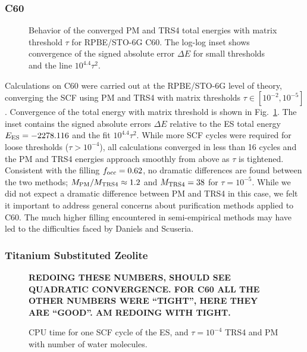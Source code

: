 \commentoutA{\documentclass[prb,aps,twocolumn,twocolumngrid,secnumarabic]{revtex4}}
\begin{document}
\subsubsection{C60}
\begin{figure}[t]
\caption{Behavior of the converged PM and TRS4 total energies with matrix threshold $\tau$
         for RPBE/STO-6G C60.  The log-log inset shows 
         convergence of the signed absolute error $\Delta E$ for small 
         thresholds and the line $10^{4.4} \tau^2$.}\label{c60convergence}
\end{figure}

Calculations on C60 were carried out at the RPBE/STO-6G level of theory, converging the
SCF using PM and TRS4 with matrix thresholds $\tau \in [10^{-2},10^{-5}]$.  
Convergence of the total energy with matrix threshold is shown in Fig.~\ref{c60convergence}.  The inset contains 
the signed absolute errors $\Delta E$ relative to the ES total energy $E_{\rm ES}=-2278.116$ 
and the fit $10^{4.4} \tau^2$.  While more SCF cycles were required for loose thresholds ($\tau > 10^{-4}$), 
all calculations converged in less than 16 cycles and the PM and TRS4 energies approach 
smoothly from above as $\tau$ is tightened.  Consistent with the filling $f_{\rm occ}=0.62$, no dramatic
differences are found between the two methods; $M_{\rm PM}/M_{\rm TRS4} \approx 1.2$ and 
$M_{\rm TRS4}=38$ for $\tau=10^{-5}$.   While we did not expect a dramatic difference between 
PM and TRS4 in this case, we felt it important to address general concerns about purification methods applied 
to C60.    The much higher filling encountered in semi-empirical methods may have led to the difficulties 
faced by Daniels and Scuseria\cite{ADaniels99}.

\subsubsection{Titanium Substituted Zeolite}

\begin{figure}[t]
\caption{\bf REDOING THESE NUMBERS, SHOULD SEE QUADRATIC CONVERGENCE.  FOR C60
ALL THE OTHER NUMBERS WERE ``TIGHT'', HERE THEY ARE ``GOOD''.  AM REDOING WITH TIGHT.}\label{xeerrors}
\end{figure}


\begin{figure}[tb]
\caption{CPU time for one SCF cycle of the ES, and 
	 $\tau=10^{-4}$ TRS4 and PM with number of water molecules.}\label{cputimes}
\end{figure}
\end{document}
